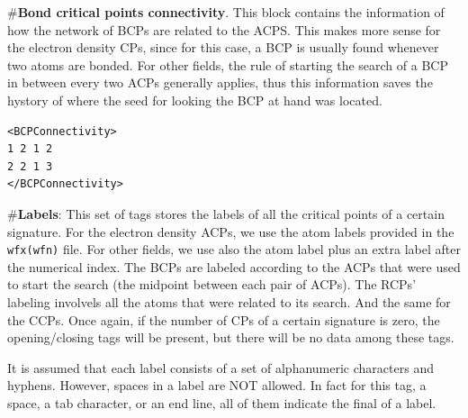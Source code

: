 \#\textbf{Bond critical points connectivity}. This block contains the information of how the network of BCPs are related to the ACPS. This makes more sense for the electron density CPs, since for this case, a BCP is usually found whenever two atoms are bonded. For other fields, the rule of starting the search of a BCP in between every two ACPs generally applies, thus this information saves the hystory of where the seed for looking the BCP at hand was located.
\begin{verbatim}
<BCPConnectivity>
1 2 1 2
2 2 1 3
</BCPConnectivity>
\end{verbatim}
\#\textbf{Labels}: This set of tags stores the labels of all the critical points of a certain signature. For the electron density ACPs, we use the atom labels provided in the \texttt{wfx(wfn)} file. For other fields, we use also the atom label plus an extra label after the numerical index. The BCPs are labeled according to the ACPs that were used to start the search (the midpoint between each pair of ACPs). The RCPs' labeling involvels all the atoms that were related to its search. And the same for the CCPs. Once again, if the number of CPs of a certain signature is zero, the opening/closing tags will be present, but there will be no data among these tags.

It is assumed that each label consists of a set of alphanumeric characters and hyphens. However, spaces in a label are NOT allowed. In fact for this tag, a space, a tab character, or an end line, all of them indicate the final of a label.


